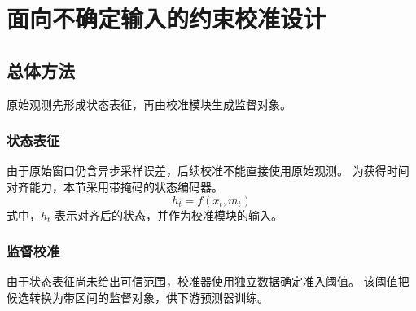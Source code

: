 \chapter{面向不确定输入的约束校准设计}
\section{总体方法}
原始观测先形成状态表征，再由校准模块生成监督对象。
\subsection{状态表征}
由于原始窗口仍含异步采样误差，后续校准不能直接使用原始观测。
为获得时间对齐能力，本节采用带掩码的状态编码器。
\begin{equation}
h_t = f(x_t, m_t)
\end{equation}
式中，$h_t$ 表示对齐后的状态，并作为校准模块的输入。
\subsection{监督校准}
由于状态表征尚未给出可信范围，校准器使用独立数据确定准入阈值。
该阈值把候选转换为带区间的监督对象，供下游预测器训练。
